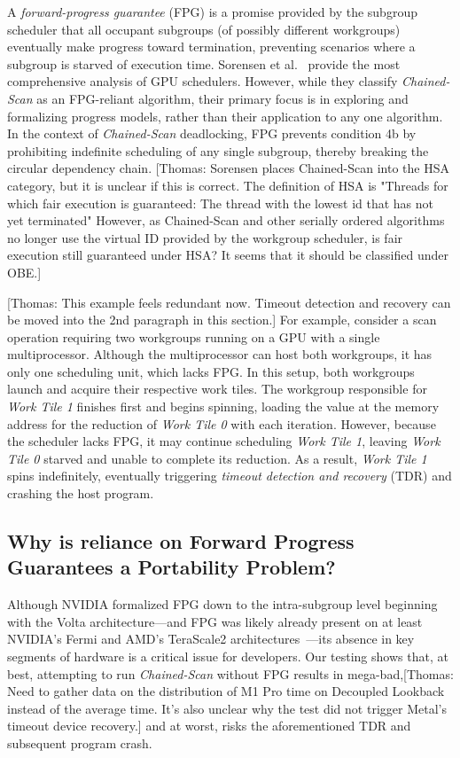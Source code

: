 \documentclass[sigconf]{acmart}
\newcommand{\thomas}[1]{{\footnotesize\color{orange}[Thomas: #1]}}
\begin{document}
A \emph{forward-progress guarantee} (FPG) is a promise provided by the subgroup scheduler that all occupant subgroups (of possibly different workgroups) eventually make progress toward termination, preventing scenarios where a subgroup is starved of execution time. Sorensen et al.~\cite{barriers, 1, 2} provide the most comprehensive analysis of GPU schedulers. However, while they classify \emph{Chained-Scan} as an FPG-reliant algorithm, their primary focus is in exploring and formalizing progress models, rather than their application to any one algorithm. In the context of \emph{Chained-Scan} deadlocking, FPG prevents condition 4b by prohibiting indefinite scheduling of any single subgroup, thereby breaking the circular dependency chain.
\thomas{Sorensen places Chained-Scan into the HSA category, but it is unclear if this is correct. The definition of HSA is \newline "Threads for which fair execution is guaranteed: The thread with the lowest id that has not yet terminated" \newline However, as Chained-Scan and other serially ordered algorithms no longer use the virtual ID provided by the workgroup scheduler, is fair execution still guaranteed under HSA? It seems that it should be classified under OBE\@.}

\thomas{This example feels redundant now. Timeout detection and recovery can be moved into the 2nd paragraph in this section.}
For example, consider a scan operation requiring two workgroups running on a GPU with a single multiprocessor. Although the multiprocessor can host both workgroups, it has only one scheduling unit, which lacks FPG\@. In this setup, both workgroups launch and acquire their respective work tiles. The workgroup responsible for \emph{Work Tile 1} finishes first and begins spinning, loading the value at the memory address for the reduction of \emph{Work Tile 0} with each iteration. However, because the scheduler lacks FPG, it may continue scheduling \emph{Work Tile 1}, leaving \emph{Work Tile 0} starved and unable to complete its reduction. As a result, \emph{Work Tile 1} spins indefinitely, eventually triggering \emph{timeout detection and recovery} (TDR) and crashing the host program.

\subsection{Why is reliance on Forward Progress Guarantees a Portability Problem?}
Although NVIDIA formalized FPG down to the intra-subgroup level beginning with the Volta architecture---and FPG was likely already present on at least NVIDIA's Fermi and AMD's TeraScale2 architectures~\cite{}---its absence in key segments of hardware is a critical issue for developers. Our testing shows that, at best, attempting to run \emph{Chained-Scan} without FPG results in mega-bad,\thomas{Need to gather data on the distribution of M1 Pro time on Decoupled Lookback instead of the average time. It's also unclear why the test did not trigger Metal's timeout device recovery.} and at worst, risks the aforementioned TDR and subsequent program crash.
\end{document}
